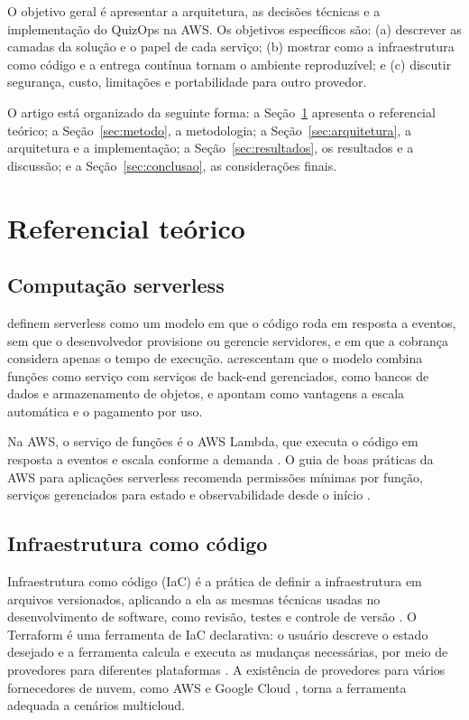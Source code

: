 \documentclass[article, 12pt, oneside, a4paper, english, brazil, sumario=tradicional]{abntex2}
\begin{document}
O objetivo geral é apresentar a arquitetura, as decisões técnicas e a implementação do QuizOps na AWS. Os objetivos específicos são: (a) descrever as camadas da solução e o papel de cada serviço; (b) mostrar como a infraestrutura como código e a entrega contínua tornam o ambiente reproduzível; e (c) discutir segurança, custo, limitações e portabilidade para outro provedor.

O artigo está organizado da seguinte forma: a Seção~\ref{sec:referencial} apresenta o referencial teórico; a Seção~\ref{sec:metodo}, a metodologia; a Seção~\ref{sec:arquitetura}, a arquitetura e a implementação; a Seção~\ref{sec:resultados}, os resultados e a discussão; e a Seção~\ref{sec:conclusao}, as considerações finais.

\section{Referencial teórico}\label{sec:referencial}

\subsection{Computação serverless}

 definem serverless como um modelo em que o código roda em resposta a eventos, sem que o desenvolvedor provisione ou gerencie servidores, e em que a cobrança considera apenas o tempo de execução.  acrescentam que o modelo combina funções como serviço com serviços de back-end gerenciados, como bancos de dados e armazenamento de objetos, e apontam como vantagens a escala automática e o pagamento por uso.

Na AWS, o serviço de funções é o AWS Lambda, que executa o código em resposta a eventos e escala conforme a demanda \cite{awslambda}. O guia de boas práticas da AWS para aplicações serverless recomenda permissões mínimas por função, serviços gerenciados para estado e observabilidade desde o início \cite{awsserverlesslens}.

\subsection{Infraestrutura como código}

Infraestrutura como código (IaC) é a prática de definir a infraestrutura em arquivos versionados, aplicando a ela as mesmas técnicas usadas no desenvolvimento de software, como revisão, testes e controle de versão \cite{fowler2016}. O Terraform é uma ferramenta de IaC declarativa: o usuário descreve o estado desejado e a ferramenta calcula e executa as mudanças necessárias, por meio de provedores para diferentes plataformas \cite{terraform}. A existência de provedores para vários fornecedores de nuvem, como AWS e Google Cloud \cite{terraformgoogle}, torna a ferramenta adequada a cenários multicloud.
\end{document}
